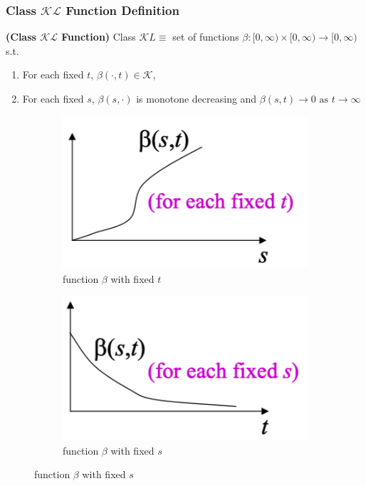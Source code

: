 \documentclass{article}
\newcommand{\bfs}[1]{\textbf{({#1}) }}
\begin{document}
\subsubsection{Class $\mathcal{KL}$ Function Definition}
\begin{defa}\bfs{Class $\mathcal{KL}$ Function}
Class  $\mathcal{K}L \equiv$ set of functions $\beta:[0, \infty) \times[0, \infty) \rightarrow[0, \infty)$ s.t.
\begin{enumerate}
    \item For each fixed  $t$, $\beta(\cdot, t) \in \mathcal{K}$,
    \item For each fixed $s$, $\beta(s, \cdot)$ is monotone decreasing and $\beta(s, t) \rightarrow 0 \text { as } t \rightarrow \infty$
\end{enumerate}
\end{defa}
\begin{figure}[H]
     \centering
     \begin{subfigure}[b]{0.4\textwidth}
         \centering
         \includegraphics[width=\textwidth]{Figs/5.png}
         \caption{function $\beta$ with fixed $t$}
     \end{subfigure}
     \hfill
     \begin{subfigure}[b]{0.4\textwidth}
         \centering
         \includegraphics[width=\textwidth]{Figs/6.png}
         \caption{function $\beta$ with fixed $s$}
     \end{subfigure}
\end{figure}
\end{document}
